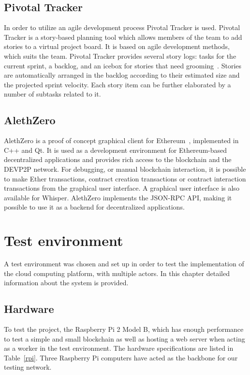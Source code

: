 \subsection{Pivotal Tracker}
In order to utilize an agile development process Pivotal Tracker is used. Pivotal Tracker is a story-based planning tool which allows members of the team to add stories to a virtual project board. It is based on agile development methods, which suits the team. Pivotal Tracker provides several story logs: tasks for the current sprint, a backlog, and an icebox for stories that need grooming~\cite{pivotaltracker}. Stories are automatically arranged in the backlog according to their estimated size and the projected sprint velocity. Each story item can be further elaborated by a number of subtasks related to it. 

\subsection{AlethZero}
AlethZero is a proof of concept graphical client for Ethereum~\cite{github-alethzero}, implemented in C++ and Qt. It is used as a development environment for Ethereum-based decentralized applications and provides rich access to the blockchain and the DEVP2P network. For debugging, or manual blockchain interaction, it is possible to make Ether transactions, contract creation transactions or contract interaction transactions from the graphical user interface. A graphical user interface is also available for Whisper. AlethZero implements the JSON-RPC API, making it possible to use it as a backend for decentralized applications.

\section{Test environment}
A test environment was chosen and set up in order to test the implementation of the cloud computing platform, with multiple actors. In this chapter detailed information about the system is provided.

\subsection{Hardware}
To test the project, the Raspberry Pi 2 Model B, which has enough performance to test a simple and small blockchain as well as hosting a web server when acting as a worker in the test environment. The hardware specifications are listed in Table~\ref{rpi}. Three Raspberry Pi computers have acted as the backbone for our testing network.

